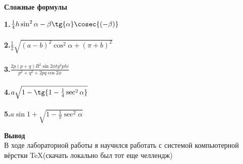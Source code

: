 \newpage

\begin{center}
    {\LARGE\textbf{Сложные формулы}}
\end{center}

\begin{table}[ht]

\textbf{1.}\quad $\frac{1}{4}h\sin^2{\alpha-\beta}\tg{\alpha}\cosec{(-\beta)}$ \\
\\
\textbf{2.}\quad $\frac{1}{2} \sqrt{(a - b)^2\cos^2{\alpha} + (\pi + b)^2}$\\
\\
\textbf{3.}\quad $\frac{2p(p + q)R^2\sin{2\phi}tg^2{phi}}{p^2 + q^2+2pq\cos{2\phi}}$\\
\\
\textbf{4.}\quad $a\sqrt{1-\tg{1-\frac{1}{4}\sec^2{\alpha}}}$\\
\\
\textbf{5.}\quad $a\sin{1+\sqrt{1 - \frac{1}{\pi}\sec^2{\alpha}}}$\\

\end{table}
\begin{center}
    {\Large\textbf{Вывод}}
    \\
    В ходе лабораторной работы я научился работать с системой компьютерной вёрстки  \TeX (скачать локально был тот еще челлендж)\\
\end{center}